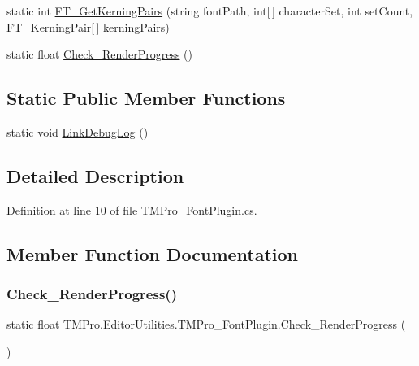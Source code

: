 \begin{DoxyCompactItemize}
\item 
static int \mbox{\hyperlink{class_t_m_pro_1_1_editor_utilities_1_1_t_m_pro___font_plugin_a837d8a6aeecd2cbc7ef6b99d59baf5b2}{F\+T\+\_\+\+Get\+Kerning\+Pairs}} (string font\+Path, int\mbox{[}$\,$\mbox{]} character\+Set, int set\+Count, \mbox{\hyperlink{struct_t_m_pro_1_1_editor_utilities_1_1_f_t___kerning_pair}{F\+T\+\_\+\+Kerning\+Pair}}\mbox{[}$\,$\mbox{]} kerning\+Pairs)
\item 
static float \mbox{\hyperlink{class_t_m_pro_1_1_editor_utilities_1_1_t_m_pro___font_plugin_a94a0ee5b0d3c86dd1cd007fd444525f1}{Check\+\_\+\+Render\+Progress}} ()
\end{DoxyCompactItemize}
\subsection*{Static Public Member Functions}
\begin{DoxyCompactItemize}
\item 
static void \mbox{\hyperlink{class_t_m_pro_1_1_editor_utilities_1_1_t_m_pro___font_plugin_a814954a0f19d2c8ff5544de7e3b00827}{Link\+Debug\+Log}} ()
\end{DoxyCompactItemize}


\subsection{Detailed Description}


Definition at line 10 of file T\+M\+Pro\+\_\+\+Font\+Plugin.\+cs.



\subsection{Member Function Documentation}
\mbox{\label{class_t_m_pro_1_1_editor_utilities_1_1_t_m_pro___font_plugin_a94a0ee5b0d3c86dd1cd007fd444525f1}} 
\subsubsection{\texorpdfstring{Check\_RenderProgress()}{Check\_RenderProgress()}}
{\footnotesize\ttfamily static float T\+M\+Pro.\+Editor\+Utilities.\+T\+M\+Pro\+\_\+\+Font\+Plugin.\+Check\+\_\+\+Render\+Progress (\begin{DoxyParamCaption}{ }\end{DoxyParamCaption})}

